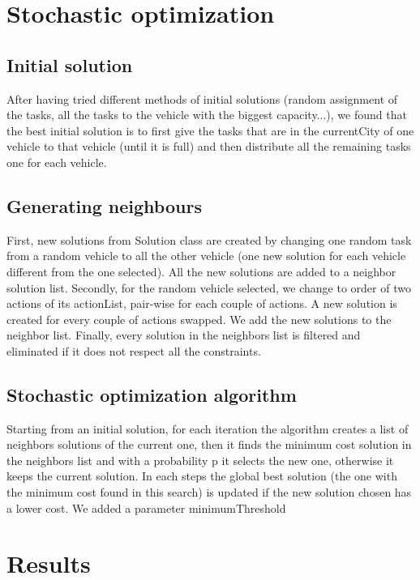 \documentclass[11pt]{article}
\begin{document}
\section{Stochastic optimization}

\subsection{Initial solution}
After having tried different methods of initial solutions (random assignment of the tasks, all the tasks to the vehicle with the biggest capacity...), we found that the best initial solution is to first give the tasks that are in the currentCity of one vehicle to that vehicle (until it is full) and then distribute all the remaining tasks one for each vehicle.

\subsection{Generating neighbours}
First, new solutions from Solution class are created by changing one random task from a random vehicle to all the other vehicle (one new solution for each vehicle different from the one selected). All the new solutions are added to a neighbor solution list. Secondly, for the random vehicle selected, we change to order of two actions of its actionList, pair-wise for each couple of actions. A new solution is created for every couple of actions swapped. We add the new solutions to the neighbor list. Finally, every solution in the neighbors list is filtered and eliminated if it does not respect all the constraints.

\subsection{Stochastic optimization algorithm}
Starting from an initial solution, for each iteration the algorithm creates a list of neighbors solutions of the current one, then it finds the minimum cost solution in the neighbors list and with a probability p it selects the new one, otherwise it keeps the current solution. In each steps the global best solution (the one with the minimum cost found in this search) is updated if the new solution chosen has a lower cost. We added a parameter minimumThreshold

\section{Results}
\end{document}
